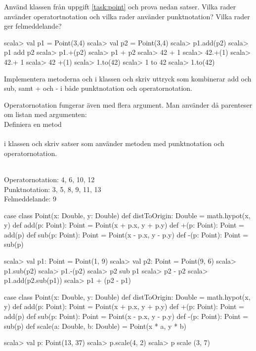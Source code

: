 \Subtask Använd klassen  från uppgift \ref{task:point} och prova nedan satser. Vilka rader använder operatortnotation och vilka rader använder punktnotation? Vilka rader ger felmeddelande?
\begin{REPL}
scala> val p1 = Point(3,4)
scala> val p2 = Point(3,4)
scala> p1.add(p2)
scala> p1 add p2
scala> p1.+(p2)
scala> p1 + p2
scala> 42 + 1
scala> 42.+(1)
scala> 42.+ 1
scala> 42 +(1)
scala> 1.to(42)
scala> 1 to 42
scala> 1.to(42)
\end{REPL}

\Subtask Implementera metoderna  och \code{-} i klassen  och skriv uttryck som kombinerar add och sub, samt + och - i både punktnotation och operatornotation.

\Subtask Operatornotation fungerar även med flera argument. Man använder då parenteser om listan med argumenten:
  \\
Definiera en metod \\
 \\
i klassen  och skriv satser som använder metoden med punktnotation och operatornotation.





\SOLUTION


\TaskSolved \what


\SubtaskSolved
\\Operatornotation:	4, 6, 10, 12
\\Punktnotation:		3, 5, 8, 9, 11, 13
\\Felmeddelande:		9

\SubtaskSolved
\begin{Code}
case class Point(x: Double, y: Double) {
  def distToOrigin: Double = math.hypot(x, y)
  def add(p: Point): Point = Point(x + p.x, y + p.y)
  def +(p: Point): Point = add(p)
  def sub(p: Point): Point = Point(x - p.x, y - p.y)
  def -(p: Point): Point = sub(p)
}
\end{Code}
\begin{REPL}
scala> val p1: Point = Point(1, 9)
scala> val p2: Point = Point(9, 6)
scala> p1.sub(p2)
scala> p1.-(p2)
scala> p2 sub p1
scala> p2 - p2
scala> p1.add(p2.sub(p1))
scala> p1 + (p2 - p1)
\end{REPL}

\SubtaskSolved
\begin{Code}
case class Point(x: Double, y: Double) {
  def distToOrigin: Double = math.hypot(x, y)
  def add(p: Point): Point = Point(x + p.x, y + p.y)
  def +(p: Point): Point = add(p)
  def sub(p: Point): Point = Point(x - p.x, y - p.y)
  def -(p: Point): Point = sub(p)
  def scale(a: Double, b: Double) = Point(x * a, y * b)
}
\end{Code}
\begin{REPL}
scala> val p: Point(13,  37)
scala> p.scale(4, 2)
scala> p scale (3, 7)
\end{REPL}


